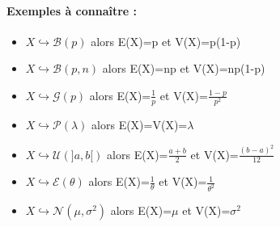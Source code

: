 \paragraph{Exemples à connaître : \\}
\begin{itemize}
\item $X\hookrightarrow \mathcal{B}(p)$ alors E(X)=p et V(X)=p(1-p)
\item $X\hookrightarrow \mathcal{B}(p,n)$ alors E(X)=np et V(X)=np(1-p)
\item $X\hookrightarrow \mathcal{G}(p)$ alors E(X)=$\frac{1}{p}$ et V(X)=$\frac{1-p}{p^2}$
\item $X\hookrightarrow \mathcal{P}(\lambda)$ alors E(X)=V(X)=$\lambda$
\item $X\hookrightarrow \mathcal{U}(]a,b[)$ alors E(X)=$\frac{a+b}{2}$ et V(X)=$\frac{(b-a)^2}{12}$
\item $X\hookrightarrow\mathcal{E}(\theta)$ alors E(X)=$\frac{1}{\theta}$ et V(X)=$\frac{1}{\theta^2}$
\item $X\hookrightarrow \mathcal{N}(\mu,\sigma^2)$ alors E(X)=$\mu$ et V(X)=$\sigma^2$
\end{itemize}
